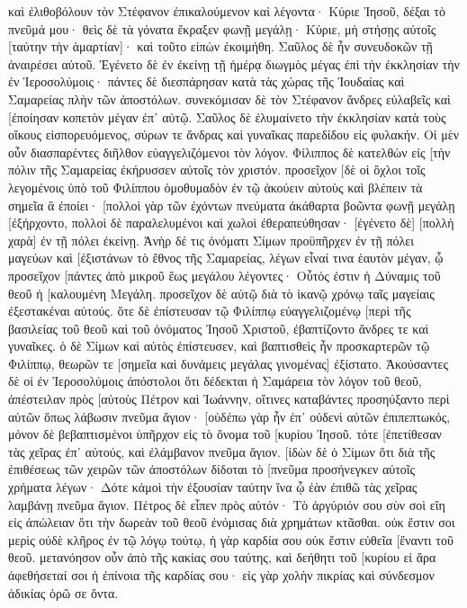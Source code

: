 καὶ ἐλιθοβόλουν τὸν Στέφανον ἐπικαλούμενον καὶ λέγοντα· Κύριε Ἰησοῦ, δέξαι τὸ πνεῦμά μου· 
θεὶς δὲ τὰ γόνατα ἔκραξεν φωνῇ μεγάλῃ· Κύριε, μὴ στήσῃς αὐτοῖς [ταύτην τὴν ἁμαρτίαν]· καὶ τοῦτο εἰπὼν ἐκοιμήθη. 
Σαῦλος δὲ ἦν συνευδοκῶν τῇ ἀναιρέσει αὐτοῦ. Ἐγένετο δὲ ἐν ἐκείνῃ τῇ ἡμέρᾳ διωγμὸς μέγας ἐπὶ τὴν ἐκκλησίαν τὴν ἐν Ἱεροσολύμοις· πάντες δὲ διεσπάρησαν κατὰ τὰς χώρας τῆς Ἰουδαίας καὶ Σαμαρείας πλὴν τῶν ἀποστόλων. 
συνεκόμισαν δὲ τὸν Στέφανον ἄνδρες εὐλαβεῖς καὶ [ἐποίησαν κοπετὸν μέγαν ἐπ᾽ αὐτῷ. 
Σαῦλος δὲ ἐλυμαίνετο τὴν ἐκκλησίαν κατὰ τοὺς οἴκους εἰσπορευόμενος, σύρων τε ἄνδρας καὶ γυναῖκας παρεδίδου εἰς φυλακήν. 
Οἱ μὲν οὖν διασπαρέντες διῆλθον εὐαγγελιζόμενοι τὸν λόγον. 
Φίλιππος δὲ κατελθὼν εἰς [τὴν πόλιν τῆς Σαμαρείας ἐκήρυσσεν αὐτοῖς τὸν χριστόν. 
προσεῖχον [δὲ οἱ ὄχλοι τοῖς λεγομένοις ὑπὸ τοῦ Φιλίππου ὁμοθυμαδὸν ἐν τῷ ἀκούειν αὐτοὺς καὶ βλέπειν τὰ σημεῖα ἃ ἐποίει· 
[πολλοὶ γὰρ τῶν ἐχόντων πνεύματα ἀκάθαρτα βοῶντα φωνῇ μεγάλῃ [ἐξήρχοντο, πολλοὶ δὲ παραλελυμένοι καὶ χωλοὶ ἐθεραπεύθησαν· 
[ἐγένετο δὲ] [πολλὴ χαρὰ] ἐν τῇ πόλει ἐκείνῃ. 
Ἀνὴρ δέ τις ὀνόματι Σίμων προϋπῆρχεν ἐν τῇ πόλει μαγεύων καὶ [ἐξιστάνων τὸ ἔθνος τῆς Σαμαρείας, λέγων εἶναί τινα ἑαυτὸν μέγαν, 
ᾧ προσεῖχον [πάντες ἀπὸ μικροῦ ἕως μεγάλου λέγοντες· Οὗτός ἐστιν ἡ Δύναμις τοῦ θεοῦ ἡ [καλουμένη Μεγάλη. 
προσεῖχον δὲ αὐτῷ διὰ τὸ ἱκανῷ χρόνῳ ταῖς μαγείαις ἐξεστακέναι αὐτούς. 
ὅτε δὲ ἐπίστευσαν τῷ Φιλίππῳ εὐαγγελιζομένῳ [περὶ τῆς βασιλείας τοῦ θεοῦ καὶ τοῦ ὀνόματος Ἰησοῦ Χριστοῦ, ἐβαπτίζοντο ἄνδρες τε καὶ γυναῖκες. 
ὁ δὲ Σίμων καὶ αὐτὸς ἐπίστευσεν, καὶ βαπτισθεὶς ἦν προσκαρτερῶν τῷ Φιλίππῳ, θεωρῶν τε [σημεῖα καὶ δυνάμεις μεγάλας γινομένας] ἐξίστατο. 
Ἀκούσαντες δὲ οἱ ἐν Ἱεροσολύμοις ἀπόστολοι ὅτι δέδεκται ἡ Σαμάρεια τὸν λόγον τοῦ θεοῦ, ἀπέστειλαν πρὸς [αὐτοὺς Πέτρον καὶ Ἰωάννην, 
οἵτινες καταβάντες προσηύξαντο περὶ αὐτῶν ὅπως λάβωσιν πνεῦμα ἅγιον· 
[οὐδέπω γὰρ ἦν ἐπ᾽ οὐδενὶ αὐτῶν ἐπιπεπτωκός, μόνον δὲ βεβαπτισμένοι ὑπῆρχον εἰς τὸ ὄνομα τοῦ [κυρίου Ἰησοῦ. 
τότε [ἐπετίθεσαν τὰς χεῖρας ἐπ᾽ αὐτούς, καὶ ἐλάμβανον πνεῦμα ἅγιον. 
[ἰδὼν δὲ ὁ Σίμων ὅτι διὰ τῆς ἐπιθέσεως τῶν χειρῶν τῶν ἀποστόλων δίδοται τὸ [πνεῦμα προσήνεγκεν αὐτοῖς χρήματα 
λέγων· Δότε κἀμοὶ τὴν ἐξουσίαν ταύτην ἵνα ᾧ ἐὰν ἐπιθῶ τὰς χεῖρας λαμβάνῃ πνεῦμα ἅγιον. 
Πέτρος δὲ εἶπεν πρὸς αὐτόν· Τὸ ἀργύριόν σου σὺν σοὶ εἴη εἰς ἀπώλειαν ὅτι τὴν δωρεὰν τοῦ θεοῦ ἐνόμισας διὰ χρημάτων κτᾶσθαι. 
οὐκ ἔστιν σοι μερὶς οὐδὲ κλῆρος ἐν τῷ λόγῳ τούτῳ, ἡ γὰρ καρδία σου οὐκ ἔστιν εὐθεῖα [ἔναντι τοῦ θεοῦ. 
μετανόησον οὖν ἀπὸ τῆς κακίας σου ταύτης, καὶ δεήθητι τοῦ [κυρίου εἰ ἄρα ἀφεθήσεταί σοι ἡ ἐπίνοια τῆς καρδίας σου· 
εἰς γὰρ χολὴν πικρίας καὶ σύνδεσμον ἀδικίας ὁρῶ σε ὄντα. 
